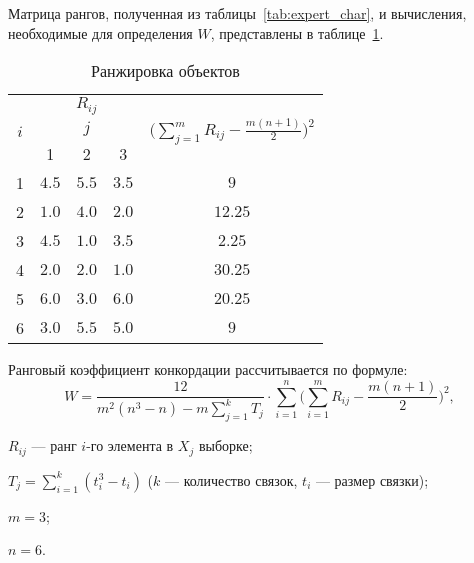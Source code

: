 Матрица рангов, полученная из таблицы~\ref{tab:expert_char}, и вычисления, необходимые для определения $W$, представлены в таблице~\ref{tab:expert_ran}.

\begin{table}[H]
	\caption{Ранжировка объектов}
	\label{tab:expert_ran}
	\begin{tabular}{|c|c|c|c|c|}
		\hline
		\multirow{3}{*}{$i$} & \multicolumn{3}{c|}{$R_{ij}$} & \multirow{3}{*}{$\bigg(\sum^m_{j=1}R_{ij} - \frac{m(n+1)}{2}\bigg)^2$}                   \\ \cline{1-4}
		                     & \multicolumn{3}{c|}{$j$}      &                                                                                          \\ \cline{1-4}
		                     & 1                             & 2                                                                      & 3     &         \\ \hline
		1                    & $4.5$                         & $5.5$                                                                  & $3.5$ & $9$     \\ \hline
		2                    & $1.0$                         & $4.0$                                                                  & $2.0$ & $12.25$ \\ \hline
		3                    & $4.5$                         & $1.0$                                                                  & $3.5$ & $2.25$  \\ \hline
		4                    & $2.0$                         & $2.0$                                                                  & $1.0$ & $30.25$ \\ \hline
		5                    & $6.0$                         & $3.0$                                                                  & $6.0$ & $20.25$ \\ \hline
		6                    & $3.0$                         & $5.5$                                                                  & $5.0$ & $9$     \\ \hline
	\end{tabular}
\end{table}

Ранговый коэффициент конкордации рассчитывается по формуле:
\[
	W = \frac{12}{m^2(n^3-n) - m \sum^k_{j=1}T_j} \cdot \sum_{i=1}^n\bigg(\sum^m_{i=1}R_{ij} - \frac{m(n+1)}{2}\bigg)^2,
\]
\begin{description}
	\item[где] $R_{ij}$ --- ранг $i$-го элемента в $X_j$ выборке;
	\item $T_j = \sum^k_{i=1} (t^3_i - t_i)$ ($k$ --- количество связок, $t_i$ --- размер связки);
	\item $m=3$;
	\item $n=6$.
\end{description}

